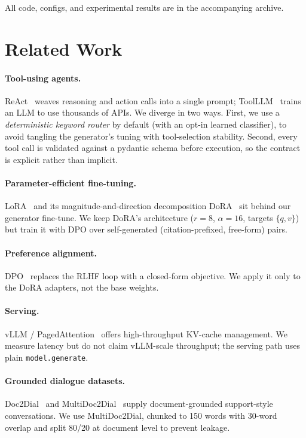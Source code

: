 \documentclass[11pt,a4paper]{article}
\begin{document}
All code, configs, and experimental results are in the accompanying archive.

\section{Related Work}
\paragraph{Tool-using agents.}
ReAct~\cite{yao2022react} weaves reasoning and action calls into a single prompt; ToolLLM~\cite{qin2023toolllm} trains an LLM to use thousands of APIs. We diverge in two ways. First, we use a \emph{deterministic keyword router} by default (with an opt-in learned classifier), to avoid tangling the generator's tuning with tool-selection stability. Second, every tool call is validated against a pydantic schema before execution, so the contract is explicit rather than implicit.

\paragraph{Parameter-efficient fine-tuning.}
LoRA~\cite{hu2021lora} and its magnitude-and-direction decomposition DoRA~\cite{liu2024dora} sit behind our generator fine-tune. We keep DoRA's architecture ($r{=}8$, $\alpha{=}16$, targets $\{q,v\}$) but train it with DPO over self-generated (citation-prefixed, free-form) pairs.

\paragraph{Preference alignment.}
DPO~\cite{rafailov2023dpo} replaces the RLHF loop with a closed-form objective. We apply it only to the DoRA adapters, not the base weights.

\paragraph{Serving.}
vLLM / PagedAttention~\cite{kwon2023vllm} offers high-throughput KV-cache management. We measure latency but do not claim vLLM-scale throughput; the serving path uses plain \texttt{model.generate}.

\paragraph{Grounded dialogue datasets.}
Doc2Dial~\cite{feng2020doc2dial} and MultiDoc2Dial~\cite{feng2021multidoc2dial} supply document-grounded support-style conversations. We use MultiDoc2Dial, chunked to 150 words with 30-word overlap and split 80/20 at document level to prevent leakage.
\end{document}
